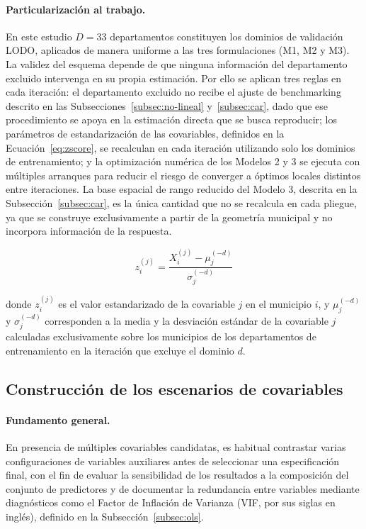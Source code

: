 \paragraph{Particularización al trabajo.}
En este estudio $D=33$ departamentos constituyen los dominios de validación LODO, aplicados de manera uniforme a las tres formulaciones (M1, M2 y M3). La validez del esquema depende de que ninguna información del departamento excluido intervenga en su propia estimación. Por ello se aplican tres reglas en cada iteración: el departamento excluido no recibe el ajuste de benchmarking descrito en las Subsecciones~\ref{subsec:no-lineal} y~\ref{subsec:car}, dado que ese procedimiento se apoya en la estimación directa que se busca reproducir; los parámetros de estandarización de las covariables, definidos en la Ecuación~\ref{eq:zscore}, se recalculan en cada iteración utilizando solo los dominios de entrenamiento; y la optimización numérica de los Modelos 2 y 3 se ejecuta con múltiples arranques para reducir el riesgo de converger a óptimos locales distintos entre iteraciones. La base espacial de rango reducido del Modelo 3, descrita en la Subsección~\ref{subsec:car}, es la única cantidad que no se recalcula en cada pliegue, ya que se construye exclusivamente a partir de la geometría municipal y no incorpora información de la respuesta.

\begin{equation}
    z_i^{(j)} = \frac{X_i^{(j)} - \mu_j^{(-d)}}{\sigma_j^{(-d)}}
    \label{eq:zscore}
\end{equation}

\noindent donde $z_i^{(j)}$ es el valor estandarizado de la covariable $j$ en el municipio $i$, y $\mu_j^{(-d)}$ y $\sigma_j^{(-d)}$ corresponden a la media y la desviación estándar de la covariable $j$ calculadas exclusivamente sobre los municipios de los departamentos de entrenamiento en la iteración que excluye el dominio $d$.

\subsection{Construcción de los escenarios de covariables}
\label{subsec:escenarios}

\paragraph{Fundamento general.}
En presencia de múltiples covariables candidatas, es habitual contrastar varias configuraciones de variables auxiliares antes de seleccionar una especificación final, con el fin de evaluar la sensibilidad de los resultados a la composición del conjunto de predictores y de documentar la redundancia entre variables mediante diagnósticos como el Factor de Inflación de Varianza (VIF, por sus siglas en inglés), definido en la Subsección~\ref{subsec:ols}.

